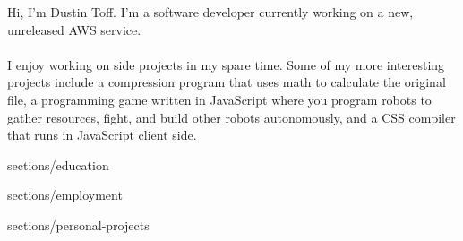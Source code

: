 


\customHeader [
    firstName = Dustin,
    lastName = Toff,
    email = me@dustintoff.com,
    phone = +1 (724) 638-7893,
    website = dustintoff.com,
    websiteLink = http://dustintoff.com,
    githubUser = quittle,
]




\parbox {\textwidth} {
    Hi, I'm Dustin Toff. I'm a software developer currently working on a new, unreleased AWS service.
    \\~\\
    I enjoy working on side projects in my spare time. Some of my more interesting projects include a compression program that uses math to calculate the original file, a programming game written in JavaScript where you program robots to gather resources, fight, and build other robots autonomously, and a CSS compiler that runs in JavaScript client side.
}

 { {sections/education}}

 { {sections/employment}}

 { {sections/personal-projects}}

